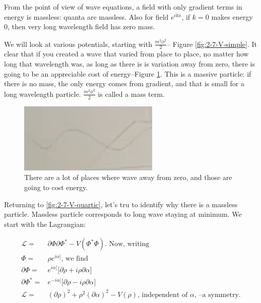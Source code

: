 \documentclass[]{article}
\begin{document}
 From the point of view of wave equations, a field with only gradient terms in energy is massless: quanta are massless. Also for field $e^{ikx}$, if $k=0$ makes energy $0$, then very long wavelength field has zero mass.
 


We will look at various potentials, starting with $\frac{m^2 \phi^2}{2}$--  Figure \ref{fig:2-7-V-simple}. It clear that if you created a wave that varied from place to place, no matter how long that wavelength was, as long as there is is variation away from zero, there is going to be an appreciable cost of energy--Figure \ref{fig:2-7-variation-from-zero}. This is a massive particle: if there is no mass, the only energy comes from gradient, and that is small for a long wavelength particle. $\frac{m^2 \phi^2}{2}$ is called a mass term.

\begin{figure}[H]
	\begin{center}
		\caption{There are a lot of places where wave away from zero, and those are going to cost energy.}\label{fig:2-7-variation-from-zero}
		\includegraphics[width=0.6\textwidth]{2-7-variation-from-zero}
	\end{center}
\end{figure}

Returning to \ref{fig:2-7-V-quartic}, let's tru to identify why there is a massless particle. Massless particle corresponds to long wave staying at minimum. We start with the Lagrangian:

\begin{align*}
	\mathcal{L} =& \partial \Phi \partial \Phi^* - V(\Phi^*\Phi) \text{. Now, writing}\\
	\Phi =& \rho e^{i \alpha]} \text{, we find} \\
	\partial \Phi =& e^{i \alpha]} \big[\partial \rho + i \rho \partial \alpha\big]\\
	\partial \Phi^* =& e^{-i \alpha]} \big[\partial \rho - i \rho \partial \alpha\big]\\
	\mathcal{L} =& (\partial \rho)^2 + \rho^2  (\partial \alpha)^2 - V(\rho) \text{, independent of $\alpha$, --a symmetry.} 
\end{align*}
\end{document}
